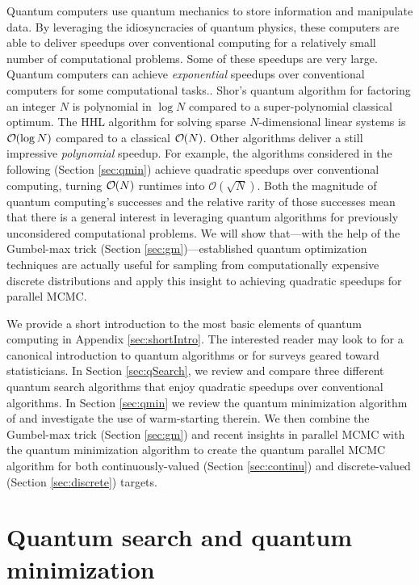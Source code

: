 \documentclass[12pt]{article} %
\newcommand{\order}[1]{{\cal O}\hspace{-0.2em}\left( #1 \right)}
\begin{document}
Quantum computers use quantum mechanics to store information and manipulate data. By leveraging the idiosyncracies of quantum physics, these computers are able to deliver speedups over conventional computing for a relatively small number of computational problems. Some of these speedups are very large. Quantum computers can achieve \emph{exponential} speedups over conventional computers for some computational tasks..  Shor's quantum algorithm for factoring an integer $N$ \citep{shor} is polynomial in $\log N$ compared to a super-polynomial classical optimum. The HHL algorithm for solving sparse $N$-dimensional linear systems \citep{harrow2009quantum} is $\order{\log N}$ compared to a classical $\order{N}$. Other algorithms deliver a still impressive \emph{polynomial} speedup.  For example, the algorithms considered in the following (Section \ref{sec:qmin}) achieve quadratic speedups over conventional computing, turning  $\order{N}$ runtimes into $\mathcal{O}(\sqrt{ N})$.  
 Both the magnitude of quantum computing's successes and the relative rarity of those successes mean that there is a general interest in leveraging quantum algorithms for previously unconsidered computational problems.  We will show that---with the help of the Gumbel-max trick (Section \ref{sec:gm})---established quantum optimization techniques are actually useful for sampling from computationally expensive discrete distributions and apply this insight to achieving quadratic speedups for parallel MCMC. 
 

We provide a short introduction to the most basic elements of quantum computing in Appendix \ref{sec:shortIntro}. The interested reader may look to \citet{nielsen2002quantum} for a canonical introduction to quantum algorithms or \citet{lopatnikova2021introduction,wang2022quantum} for surveys geared toward statisticians.   In Section \ref{sec:qSearch}, we review and compare three different quantum search algorithms that enjoy quadratic speedups over conventional algorithms.  In Section \ref{sec:qmin} we review the quantum minimization algorithm of \citet{durr1996quantum} and investigate the use of warm-starting therein.  We then combine the Gumbel-max trick (Section \ref{sec:gm}) and recent insights in parallel MCMC with the quantum minimization algorithm to create the quantum parallel MCMC algorithm for both continuously-valued (Section \ref{sec:continu}) and discrete-valued (Section \ref{sec:discrete}) targets. 






\section{Quantum search and quantum minimization}\label{sec:searchAndMin}
\end{document}

